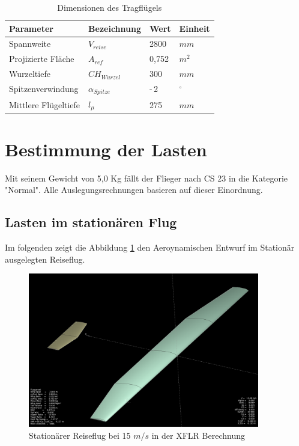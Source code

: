 \begin{table}[h]
\centering
\begin{tabular}{|l|l|l|l|}
\hline
Parameter  & Bezeichnung &  Wert & Einheit \\ \hline
Spannweite  & $V_{reise}$ & 2800 & $mm$\\ \hline
Projizierte Fläche & $A_{ref}$  & 0,752 & $m^2$\\ \hline
Wurzeltiefe & $CH_{Wurzel}$ & 300 & $mm$ \\ \hline
Spitzenverwindung & $\alpha_{Spitze}$ & -\,2 & $^\circ$\\ \hline
Mittlere Flügeltiefe & $l_{\mu}$ & 275 & $mm$ \\ \hline
\end{tabular}
\caption{Dimensionen des Tragflügels}
\label{tab:Dimensionen des Tragflügels}
\end{table}

\section{Bestimmung der Lasten}

Mit seinem Gewicht von 5,0 Kg fällt der Flieger nach CS 23 in die Kategorie "Normal".
Alle Auslegungsrechnungen basieren auf dieser Einordnung.

\subsection{Lasten im stationären Flug}

Im folgenden zeigt die Abbildung \ref{fig:Stationärer Reiseflug in XFLR} den Aeroynamischen Entwurf im Stationär ausgelegten Reiseflug.

\begin{figure}[H]
\centering
\includegraphics[width=0.9\textwidth]{bilder/Fotos/Aeroentwurf_Fluegelkonstruktion.png}
\caption{Stationärer Reiseflug bei 15 $m/s$ in der XFLR Berechnung} 
\label{fig:Stationärer Reiseflug in XFLR}
\end{figure}


